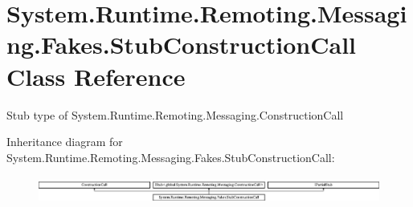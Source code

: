 \hypertarget{class_system_1_1_runtime_1_1_remoting_1_1_messaging_1_1_fakes_1_1_stub_construction_call}{\section{System.\-Runtime.\-Remoting.\-Messaging.\-Fakes.\-Stub\-Construction\-Call Class Reference}
\label{class_system_1_1_runtime_1_1_remoting_1_1_messaging_1_1_fakes_1_1_stub_construction_call}
}


Stub type of System.\-Runtime.\-Remoting.\-Messaging.\-Construction\-Call 


Inheritance diagram for System.\-Runtime.\-Remoting.\-Messaging.\-Fakes.\-Stub\-Construction\-Call\-:\begin{figure}[H]
\begin{center}
\leavevmode
\includegraphics[height=0.899598cm]{class_system_1_1_runtime_1_1_remoting_1_1_messaging_1_1_fakes_1_1_stub_construction_call}
\end{center}
\end{figure}
